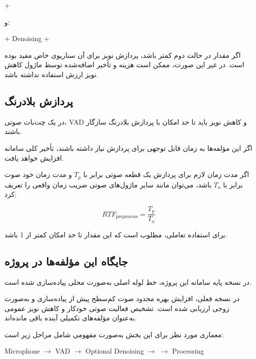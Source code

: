 \begin{center}
 + 
\end{center}

و:

\begin{center}
 + Denoising + 
\end{center}

اگر مقدار  در حالت دوم کمتر باشد، پردازش نویز برای آن
سناریوی خاص مفید بوده است.
در غیر این صورت، ممکن است هزینه و تأخیر اضافه‌شده توسط
ماژول کاهش نویز ارزش استفاده نداشته باشد.


\subsection{پردازش بلادرنگ}

در یک چت‌بات صوتی، VAD و کاهش نویز باید تا حد امکان با
پردازش بلادرنگ سازگار باشند.

اگر این مؤلفه‌ها به زمان قابل توجهی برای پردازش نیاز داشته
باشند، تأخیر کلی سامانه افزایش خواهد یافت.

اگر مدت زمان لازم برای پردازش یک قطعه صوتی برابر با
$T_p$ و مدت زمان خود صوت برابر با $T_a$ باشد، می‌توان مانند
سایر ماژول‌های صوتی ضریب زمان واقعی را تعریف کرد:

\begin{equation}
RTF_{\mathrm{preprocess}}
=
\frac{T_p}{T_a}
\end{equation}

برای استفاده تعاملی، مطلوب است که این مقدار تا حد امکان کمتر
از 1 باشد.


\subsection{جایگاه این مؤلفه‌ها در پروژه}

در نسخه پایه سامانه این پروژه، خط لوله اصلی
به‌صورت محلی پیاده‌سازی شده است.

در نسخه فعلی، افزایش بهره محدود صوت کم‌سطح پیش از 
پیاده‌سازی و به‌صورت زوجی ارزیابی شده است. تشخیص فعالیت صوتی
خودکار و کاهش نویز عمومی به‌عنوان مؤلفه‌های تکمیلی آینده باقی
مانده‌اند.

معماری مورد نظر برای این بخش به‌صورت مفهومی شامل مراحل زیر
است:

\begin{center}
Microphone
$\longrightarrow$
VAD
$\longrightarrow$
Optional Denoising
$\longrightarrow$
$\longrightarrow$
 Processing
\end{center}

